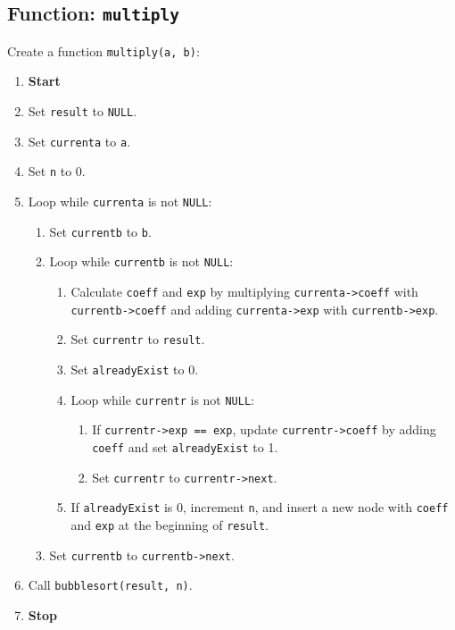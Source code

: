 {  \subsection{Function: \texttt{multiply}}
  Create a function \texttt{multiply(a, b)}:
  \begin{enumerate}[label=\arabic*:,left=0pt]
    \item \textbf{Start}
    \item Set \texttt{result} to \texttt{NULL}.
    \item Set \texttt{currenta} to \texttt{a}.
    \item Set \texttt{n} to 0.
    \item Loop while \texttt{currenta} is not \texttt{NULL}:
          \begin{enumerate}[label=2.\arabic*:, start=1]
            \item Set \texttt{currentb} to \texttt{b}.
            \item Loop while \texttt{currentb} is not \texttt{NULL}:
                  \begin{enumerate}[label=2.2.\arabic*:, start=1]
                    \item Calculate \texttt{coeff} and \texttt{exp} by multiplying \texttt{currenta->coeff} with \texttt{currentb->coeff} and adding \texttt{currenta->exp} with \texttt{currentb->exp}.
                    \item Set \texttt{currentr} to \texttt{result}.
                    \item Set \texttt{alreadyExist} to 0.
                    \item Loop while \texttt{currentr} is not \texttt{NULL}:
                          \begin{enumerate}[label=2.2.3.\arabic*:, start=1]
                            \item If \texttt{currentr->exp == exp}, update \texttt{currentr->coeff} by adding \texttt{coeff} and set \texttt{alreadyExist} to 1.
                            \item Set \texttt{currentr} to \texttt{currentr->next}.
                          \end{enumerate}
                    \item If \texttt{alreadyExist} is 0, increment \texttt{n}, and insert a new node with \texttt{coeff} and \texttt{exp} at the beginning of \texttt{result}.
                  \end{enumerate}
            \item Set \texttt{currentb} to \texttt{currentb->next}.
          \end{enumerate}
    \item Call \texttt{bubblesort(result, n)}.
    \item \textbf{Stop}
  \end{enumerate}

}

